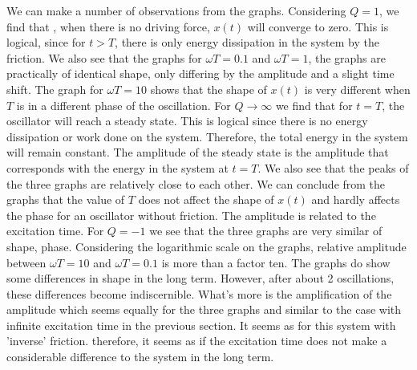 We can make a number of observations from the graphs. Considering $Q = 1$, we find that , when there is no driving force, $x(t)$ will converge to zero. This is logical, since for $t>T$, there is only energy dissipation in the system by the friction. We also see that the graphs for $\omega T = 0.1$ and $\omega T =1$, the graphs are practically of identical shape, only differing by the amplitude and a slight time shift. The graph for $\omega T = 10$ shows that the shape of $x(t)$ is very different when $T$ is in a different phase of the oscillation.
For $Q \rightarrow \infty$ we find that for $t=T$, the oscillator will reach a steady state. This is logical since there is no energy dissipation or work done on the system. Therefore, the total energy in the system will remain constant. The amplitude of the steady state is the amplitude that corresponds with the energy in the system at $t=T$. We also see that the peaks of the three graphs are relatively close to each other. We can conclude from the graphs that the value of $T$ does not affect the shape of $x(t)$ and hardly affects the phase for an oscillator without friction. The amplitude is related to the excitation time.
For $Q=-1$ we see that the three graphs are very similar of shape, phase. Considering the logarithmic scale on the graphs, relative amplitude between $\omega T = 10$ and $\omega T = 0.1$ is more than a factor ten. The graphs do show some differences in shape in the long term. However, after about 2 oscillations, these differences become indiscernible. What's more is the amplification of the amplitude which seems equally for the three graphs and similar to the case with infinite excitation time in the previous section. It seems as for this system with 'inverse' friction. therefore, it seems as if the excitation time does not make a considerable difference to the system in the long term.
